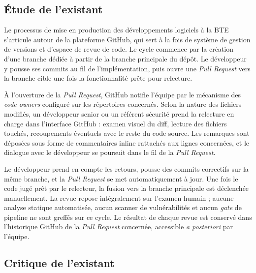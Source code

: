     \subsection{Étude de l'existant}

        Le processus de mise en production des développements logiciels à la BTE
        s'articule autour de la plateforme GitHub, qui sert à la fois de système de
        gestion de versions et d'espace de revue de code. Le cycle commence par la
        création d'une branche dédiée à partir de la branche principale du dépôt.
        Le développeur y pousse ses commits au fil de l'implémentation, puis ouvre
        une \textit{Pull Request} vers la branche cible une fois la fonctionnalité
        prête pour relecture.

        À l'ouverture de la \textit{Pull Request}, GitHub notifie l'équipe par le
        mécanisme des \textit{code owners} configuré sur les répertoires concernés.
        Selon la nature des fichiers modifiés, un développeur senior ou un référent
        sécurité prend la relecture en charge dans l'interface GitHub : examen visuel
        du diff, lecture des fichiers touchés, recoupements éventuels avec le reste
        du code source. Les remarques sont déposées sous forme de commentaires inline
        rattachés aux lignes concernées, et le dialogue avec le développeur se
        poursuit dans le fil de la \textit{Pull Request}.

        Le développeur prend en compte les retours, pousse des commits correctifs
        sur la même branche, et la \textit{Pull Request} se met automatiquement à
        jour. Une fois le code jugé prêt par le relecteur, la fusion vers la branche
        principale est déclenchée manuellement. La revue repose intégralement sur
        l'examen humain ; aucune analyse statique automatisée, aucun scanner de
        vulnérabilités et aucun \textit{gate} de pipeline ne sont greffés sur ce
        cycle. Le résultat de chaque revue est conservé dans l'historique GitHub
        de la \textit{Pull Request} concernée, accessible \textit{a posteriori} par
        l'équipe.

    \subsection{Critique de l'existant}

